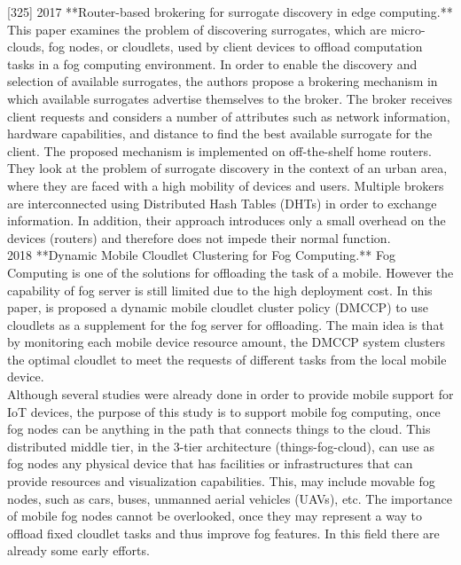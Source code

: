 [325] 2017 **Router-based brokering for surrogate discovery in edge computing.**
This paper examines the problem of discovering surrogates, which are micro-clouds, fog nodes, or cloudlets, used by client devices to offload computation tasks in a fog computing environment. In order to enable the discovery and selection of available surrogates, the authors propose a brokering mechanism in which available surrogates advertise themselves to the broker. The broker receives client requests and considers a number of attributes such as network information, hardware capabilities, and distance to find the best available surrogate for the client. The proposed mechanism is implemented on off-the-shelf home routers. They look at the problem of surrogate discovery in the context of an urban area, where they are faced with a high mobility of devices and users. Multiple brokers are interconnected using Distributed Hash Tables (DHTs) in order to exchange information. In addition, their approach introduces only a small overhead on the devices (routers) and therefore does not impede their normal function.\\

2018 **Dynamic Mobile Cloudlet Clustering for Fog Computing.**
Fog Computing is one of the solutions for offloading the task of a mobile. However the capability of fog server is still limited due to the high deployment cost. In this paper, is proposed a dynamic mobile cloudlet cluster policy (DMCCP) to use cloudlets as a supplement for the fog server for offloading. The main idea is that by monitoring each mobile device resource amount, the DMCCP system clusters the optimal cloudlet to meet the requests of different tasks from the local mobile device.\\

\noindent\tab Although several studies were already done in order to provide mobile support for IoT devices, the purpose of this study is to support mobile fog computing, once fog nodes can be anything in the path that connects things to the cloud. This distributed middle tier, in the 3-tier architecture (things-fog-cloud), can use as fog nodes any physical device that has facilities or infrastructures that can provide resources and visualization capabilities. This, may include movable fog nodes, such as cars, buses, unmanned aerial vehicles (UAVs), etc. The importance of mobile fog nodes cannot be overlooked, once they may represent a way to offload fixed cloudlet tasks and thus improve fog features. In this field there are already some early efforts.\\

